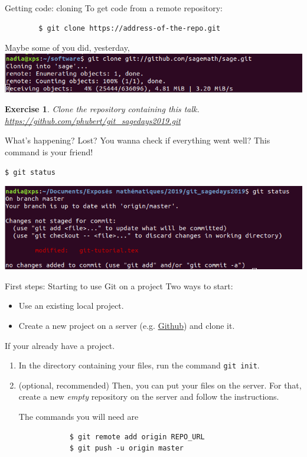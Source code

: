 \documentclass{beamer}
\newtheorem{exo}{Exercise}
\begin{document}
	\begin{frame}[fragile]{Getting code: cloning}
		To get code from a remote repository:
		\begin{verbatim}
		$ git clone https://address-of-the-repo.git
		\end{verbatim}
		Maybe some of you did, yesterday,
		\includegraphics[width=\linewidth]{clone}
		\pause
		\begin{exo}
			Clone the repository containing this talk.
			\url{https://github.com/phubert/git_sagedays2019.git}
		\end{exo}
	\end{frame}

	\begin{frame}[fragile]{What's happening?}
		Lost? You wanna check if everything went well? This command is your friend!
		\begin{verbatim}
$ git status
		\end{verbatim}
		\begin{center}
			\includegraphics[width=\linewidth]{status}
		\end{center}
	\end{frame}

	\begin{frame}[fragile]{First steps: Starting to use Git on a project}
		Two ways to start: 
		\begin{itemize}
			\item Use an existing local project.
			\item Create a new project on a server (e.g. \href{https://github.com/}{Github}) and clone it. \newline
		\end{itemize}
	
		If your already have a project.
		\begin{enumerate}
		\item  In the directory containing your files, run the command 
		\mbox{\texttt{git init}}.
		
		\item  (optional, recommended) Then, you can put your files on the server. For that, create a new \emph{empty} repository on the server and follow the instructions.
		
		The commands you will need are 
		\begin{verbatim}
			$ git remote add origin REPO_URL
			$ git push -u origin master
		\end{verbatim}
		
		\end{enumerate}   
	\end{frame}
\end{document}
